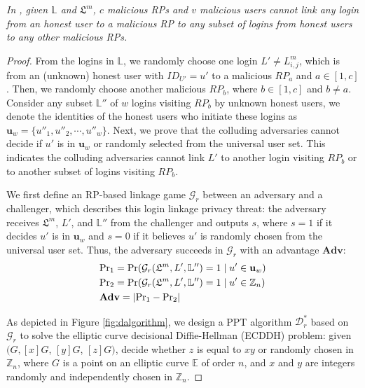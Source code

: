   \begin{theorem}\label{rp-privacy-proof}
  \emph{In \usso, given $\mathbb{L}$ and $\mathfrak{L}^m$, $c$ malicious RPs and $v$ malicious users cannot link any login from an honest user to a malicious RP to any subset of logins from honest users to any other malicious RPs.}
  \end{theorem}


  \begin{proof} 
  From the logins in $\mathbb{L}$,
  we randomly choose one login $L' \neq L^m_{i,j}$,
  which is from an (unknown) honest user with $ID_{U'}=u'$ to a malicious $RP_a$ and $a \in [1,c]$.
  Then, we randomly choose another malicious $RP_b$, where $b \in [1,c]$ and $b \neq a$.
  Consider any subset $\mathbb{L}''$ of $w$ logins visiting $RP_b$ by unknown honest users,
  we denote the identities of the honest users who initiate these logins as $\mathbf{u}_w=\{{u''_1}, {u''_2}, \cdots, {u''_w}\}$.
  Next, we prove that the colluding adversaries cannot decide if $u'$ is in $\mathbf{u}_w$ or randomly selected from the universal user set.
  This indicates the colluding adversaries cannot link $L'$ to another login visiting $RP_b$
  or to another subset of logins visiting $RP_b$.

  We first define an RP-based linkage game $\mathcal{G}_r$ between an adversary and a challenger, which describes this login linkage privacy threat: the adversary receives $\mathfrak{L}^m$, $L'$, and $\mathbb{L}''$ from the challenger and outputs $s$, where $s = 1$ if it decides $u'$ is in $\mathbf{u}_w$ %
  and $s=0$ if it believes $u'$ is randomly chosen from the universal user set.
  Thus, the adversary succeeds in $\mathcal{G}_r$ with an advantage $\mathbf{Adv}$:
  \begin{align*}
  &{\rm Pr}_1={\rm Pr}(\mathcal{G}_r(\mathfrak{L}^m, L', \mathbb{L}'')=1 \;| \; u' \in \mathbf{u}_w)  \\
  &{\rm Pr}_2={\rm Pr}(\mathcal{G}_r(\mathfrak{L}^m, L', \mathbb{L}'')=1 \; | \; u' \in \mathbb{Z}_n)\\
  &{\mathbf{Adv}}=|{\rm Pr}_1-{\rm Pr}_2|
  \end{align*}

  As depicted in Figure \ref{fig:dalgorithm}, we design a PPT algorithm $\mathcal{D}^*_r$ based on $\mathcal{G}_r$ to solve the elliptic curve decisional Diffie-Hellman (ECDDH) problem: given $(G, [x]G$, $[y]G$, $[z]G)$, decide whether $z$ is equal to $xy$ or randomly chosen in $\mathbb{Z}_n$, where $G$ is a point on an elliptic curve $\mathbb{E}$ of order $n$, and $x$ and $y$ are integers randomly and independently chosen in $\mathbb{Z}_n$.


\end{proof}
